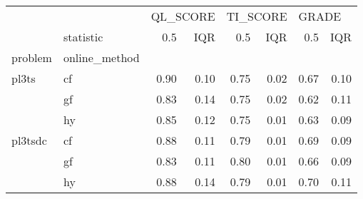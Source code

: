 \begin{tabular}{llrrrrrr}
\toprule
        & {} & \multicolumn{2}{l}{QL\_SCORE} & \multicolumn{2}{l}{TI\_SCORE} & \multicolumn{2}{l}{GRADE} \\
        & statistic &      0.5 &  IQR &      0.5 &  IQR &   0.5 &  IQR \\
problem & online\_method &          &      &          &      &       &      \\
\midrule
pl3ts & cf &     0.90 & 0.10 &     0.75 & 0.02 &  0.67 & 0.10 \\
        & gf &     0.83 & 0.14 &     0.75 & 0.02 &  0.62 & 0.11 \\
        & hy &     0.85 & 0.12 &     0.75 & 0.01 &  0.63 & 0.09 \\
pl3tsdc & cf &     0.88 & 0.11 &     0.79 & 0.01 &  0.69 & 0.09 \\
        & gf &     0.83 & 0.11 &     0.80 & 0.01 &  0.66 & 0.09 \\
        & hy &     0.88 & 0.14 &     0.79 & 0.01 &  0.70 & 0.11 \\
\bottomrule
\end{tabular}
